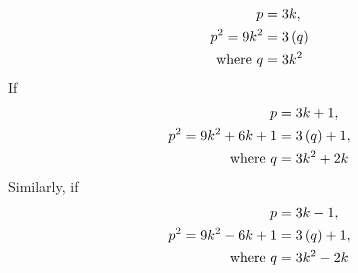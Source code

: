 \documentclass[journal,12pt,twocolumn]{IEEEtran}
\begin{document}
\begin{enumerate}[label=4.\arabic*]
\begin{align}
		    p &= 3k, 
		    \\
		    p^2 = 9k^2 &= 3\left(q\right)
		    \\
		    \text{where } q &= 3k^2
	    \end{align}
	    If 
	    \begin{align}
		    p &= 3k+1, 
		    \\
		    p^2 = 9k^2 + 6k + 1&= 3\left(q\right)+1, 
		    \\
		    \text{where } q &= 3k^2+2k
	    \end{align}
	    Similarly, if
	    \begin{align}
		    p &= 3k-1, 
		    \\
		    p^2 = 9k^2 - 6k + 1&= 3\left(q\right)+1, 
		    \\
		    \text{where } q &= 3k^2-2k
	    \end{align}


\end{enumerate}
\end{document}
